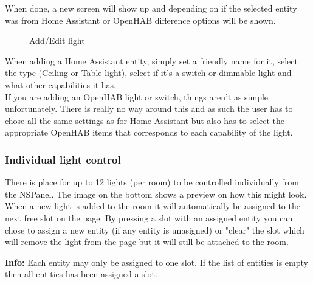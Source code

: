 \documentclass[10pt]{article}
\newcommand{\info}[1]{\begin{infoBox} \textbf{Info:} #1 \end{infoBox}}
\begin{document}
    When done, a new screen will show up and depending on if the selected entity was from Home Assistant or OpenHAB difference options will be shown.
    \begin{figure}[H]
    \centering
    \qquad
    \caption{Add/Edit light}%
    \end{figure}
    
    When adding a Home Assistant entity, simply set a friendly name for it, select the type (Ceiling or Table light), select if it's a switch or dimmable light and what other capabilities it has.\\
    If you are adding an OpenHAB light or switch, things aren't as simple unfortunately. There is really no way around this and as such the user has to chose all the same settings as for Home Assistant but also has to select the appropriate OpenHAB items that corresponds to each capability of the light.

    \subsubsection{Individual light control}
    There is place for up to 12 lights (per room) to be controlled individually from the NSPanel. The image on the bottom shows a preview on how this might look. When a new light is added to the room it will automatically be assigned to the next free slot on the page. By pressing a slot with an assigned entity you can chose to assign a new entity (if any entity is unasigned) or "clear" the slot which will remove the light from the page but it will still be attached to the room.
    \info{Each entity may only be assigned to one slot. If the list of entities is empty then all entities has been assigned a slot.}
\end{document}
